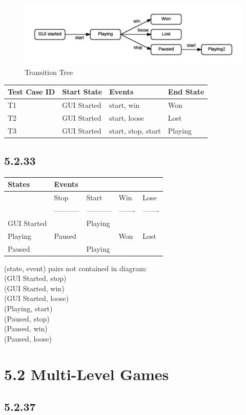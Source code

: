 \documentclass[]{article}
\begin{document}
\begin{figure}
\centering
\includegraphics{5.1.32.png}
\caption{Transition Tree}
\end{figure}

\begin{longtable}[]{@{}llll@{}}
\toprule
Test Case ID & Start State & Events & End State\tabularnewline
\midrule
\endhead
T1 & GUI Started & start, win & Won\tabularnewline
T2 & GUI Started & start, loose & Lost\tabularnewline
T3 & GUI Started & start, stop, start & Playing\tabularnewline
\bottomrule
\end{longtable}

\subsection{5.2.33}\label{section-21}

\begin{longtable}[]{@{}lllll@{}}
\toprule
States & Events & & &\tabularnewline
\midrule
\endhead
& Stop & Start & Win & Lose\tabularnewline
& ----------- & ----------- & ------- & -------\tabularnewline
GUI Started & & Playing & &\tabularnewline
Playing & Paused & & Won & Lost\tabularnewline
Paused & & Playing & &\tabularnewline
\bottomrule
\end{longtable}

(state, event) pairs not contained in diagram:\\
(GUI Started, stop)\\
(GUI Started, win)\\
(GUI Started, loose)\\
(Playing, start)\\
(Paused, stop)\\
(Paused, win)\\
(Paused, loose)

\section{5.2 Multi-Level Games}\label{multi-level-games}

\subsection{5.2.37}\label{section-22}
\end{document}
